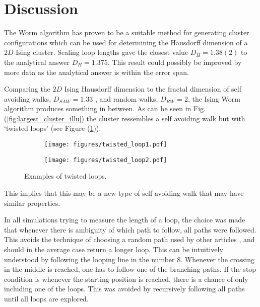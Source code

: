 \section{Discussion}
\label{sec:Discussion}

The Worm algorithm has proven to be a suitable method for generating cluster configurations which can be used for determining the Hausdorff dimension of a $2D$ Ising cluster. Scaling loop lengths gave the closest value $D_H = 1.38(2)$ to the analytical answer $D_H = 1.375$\cite{Duplantier:GeoHausdorff}. This result could possibly be improved by more data as the analytical answer is within the error span.

Comparing the $2D$ Ising Hausdorff dimension to the fractal dimension of self avoiding walks, $D_{SAW} = 1.33$ \cite{Vilgis:FlorySAW}, and random walks, $D_{RW} = 2$, the Ising Worm algorithm produces something in between. As can be seen in Fig. (\ref{fig:largest_cluster_illu}) the cluster ressembles a self avoiding walk but with `twisted loops' (see Figure (\ref{fig:twisted_loops})).

\begin{figure}[h!]
\centering
    \begin{subfigure}{.4\textwidth}
        \centering
        \texttt{[image: figures/twisted\_loop1.pdf]}
    \end{subfigure}
    \begin{subfigure}{.4\textwidth}
        \centering
        \texttt{[image: figures/twisted\_loop2.pdf]}
    \end{subfigure}
    \caption{Examples of twisted loops.}
\label{fig:twisted_loops}
\end{figure}

This implies that this may be a new type of self avoiding walk that may have similar properties.

In all simulations trying to measure the length of a loop, the choice was made that whenever there is ambiguity of which path to follow, all paths were followed. This avoids the technique of choosing a random path used by other articles \cite{Hove:hausdorff_crit_fluctuations}, and should in the average case return a longer loop. This can be intuitively understood by following the looping line in the number $8$. Whenever the crossing in the middle is reached, one has to follow one of the branching paths. If the stop condition is whenever the starting position is reached, there is a chance of only including one of the loops. This was avoided by recursively following all paths until all loops are explored.

